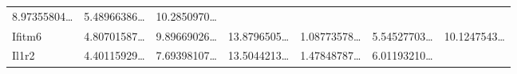 \documentclass[
]{article}
\begin{document}
\begin{longtable}[]{@{}lllllll@{}}
\begin{minipage}[t]{0.12\columnwidth}
8.97355804\ldots{}\strut
\end{minipage} & \begin{minipage}[t]{0.12\columnwidth}\raggedright
5.48966386\ldots{}\strut
\end{minipage} & \begin{minipage}[t]{0.12\columnwidth}\raggedright
10.2850970\ldots{}\strut
\end{minipage}\tabularnewline
\begin{minipage}[t]{0.08\columnwidth}\raggedright
Ifitm6\strut
\end{minipage} & \begin{minipage}[t]{0.12\columnwidth}\raggedright
4.80701587\ldots{}\strut
\end{minipage} & \begin{minipage}[t]{0.12\columnwidth}\raggedright
9.89669026\ldots{}\strut
\end{minipage} & \begin{minipage}[t]{0.12\columnwidth}\raggedright
13.8796505\ldots{}\strut
\end{minipage} & \begin{minipage}[t]{0.12\columnwidth}\raggedright
1.08773578\ldots{}\strut
\end{minipage} & \begin{minipage}[t]{0.12\columnwidth}\raggedright
5.54527703\ldots{}\strut
\end{minipage} & \begin{minipage}[t]{0.12\columnwidth}\raggedright
10.1247543\ldots{}\strut
\end{minipage}\tabularnewline
\begin{minipage}[t]{0.08\columnwidth}\raggedright
Il1r2\strut
\end{minipage} & \begin{minipage}[t]{0.12\columnwidth}\raggedright
4.40115929\ldots{}\strut
\end{minipage} & \begin{minipage}[t]{0.12\columnwidth}\raggedright
7.69398107\ldots{}\strut
\end{minipage} & \begin{minipage}[t]{0.12\columnwidth}\raggedright
13.5044213\ldots{}\strut
\end{minipage} & \begin{minipage}[t]{0.12\columnwidth}\raggedright
1.47848787\ldots{}\strut
\end{minipage} & \begin{minipage}[t]{0.12\columnwidth}\raggedright
6.01193210\ldots{}\strut

\end{minipage}
\end{longtable}
\end{document}
